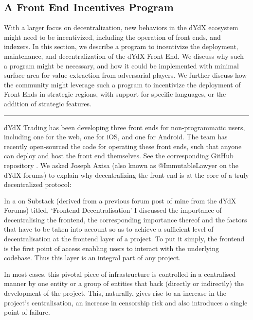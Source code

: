 \begin{fullwidth}
    \section{A Front End Incentives Program} \label{sec:feip}

    \begin{adjustwidth}{2cm}{2cm}
        \justify
        With a larger focus on decentralization, new behaviors in the dYdX ecosystem might need to be incentivized, including the operation of front ends, and indexers. In this section, we describe a program to incentivize the deployment, maintenance, and decentralization of the dYdX Front End. We discuss why such a program might be necessary, and how it could be implemented with minimal surface area for value extraction from adversarial players. We further discuss how the community might leverage such a program to incentivize the deployment of Front Ends in strategic regions, with support for specific languages, or the addition of strategic features.
    \end{adjustwidth}
    
    \textcolor{gray}{\rule{\linewidth}{0.1mm}}
\end{fullwidth}

    dYdX Trading has been developing three front ends for non-programmatic users, including one for the web, one for iOS, and one for Android. The team has recently open-sourced the code for operating these front ends, such that anyone can deploy and host the front end themselves. See the corresponding GitHub repository . We asked Joseph Axisa (also known as @ImmutableLawyer on the dYdX forums) to explain why decentralizing the front end is at the core of a truly decentralized protocol:

    \begin{displayquote}
        In a  on Substack (derived from a previous forum post of mine from the dYdX Forums) titled, ‘Frontend Decentralisation’ I discussed the importance of decentralising the frontend, the corresponding importance thereof and the factors that have to be taken into account so as to achieve a sufficient level of decentralisation at the frontend layer of a project. To put it simply, the frontend is the first point of access enabling users to interact with the underlying codebase. Thus this layer is an integral part of any project. 

        In most cases, this pivotal piece of infrastructure is controlled in a centralised manner by one entity or a group of entities that back (directly or indirectly) the development of the project. This, naturally, gives rise to an increase in the project’s centralisation, an increase in censorship risk and also introduces a single point of failure.
    \end{displayquote}

